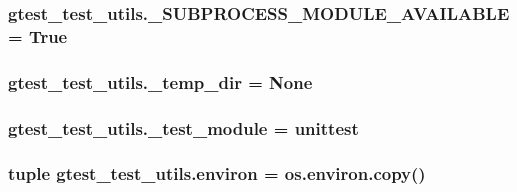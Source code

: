 \subsubsection[{\+\_\+\+S\+U\+B\+P\+R\+O\+C\+E\+S\+S\+\_\+\+M\+O\+D\+U\+L\+E\+\_\+\+A\+V\+A\+I\+L\+A\+B\+L\+E}]{\setlength{\rightskip}{0pt plus 5cm}gtest\+\_\+test\+\_\+utils.\+\_\+\+S\+U\+B\+P\+R\+O\+C\+E\+S\+S\+\_\+\+M\+O\+D\+U\+L\+E\+\_\+\+A\+V\+A\+I\+L\+A\+B\+L\+E = True}\label{namespacegtest__test__utils_af29139d2934cf1c6da2af020a399c36e}
\hypertarget{namespacegtest__test__utils_a63e521665d381cdeddd27066f11bdbbf}{}
\subsubsection[{\+\_\+temp\+\_\+dir}]{\setlength{\rightskip}{0pt plus 5cm}gtest\+\_\+test\+\_\+utils.\+\_\+temp\+\_\+dir = None}\label{namespacegtest__test__utils_a63e521665d381cdeddd27066f11bdbbf}
\hypertarget{namespacegtest__test__utils_aa19abf2658f4160d2fcb6ce94d16612c}{}
\subsubsection[{\+\_\+test\+\_\+module}]{\setlength{\rightskip}{0pt plus 5cm}gtest\+\_\+test\+\_\+utils.\+\_\+test\+\_\+module = unittest}\label{namespacegtest__test__utils_aa19abf2658f4160d2fcb6ce94d16612c}
\hypertarget{namespacegtest__test__utils_abe5d1d27c225592317b5bda5b4309471}{}
\subsubsection[{environ}]{\setlength{\rightskip}{0pt plus 5cm}tuple gtest\+\_\+test\+\_\+utils.\+environ = os.\+environ.\+copy()}\label{namespacegtest__test__utils_abe5d1d27c225592317b5bda5b4309471}
\hypertarget{namespacegtest__test__utils_aeb3755b4dd33aabe1baee781fecc1e66}{}
